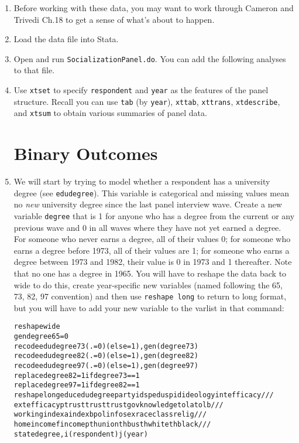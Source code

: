 \documentclass[a4paper,12pt]{article}
\begin{document}
\begin{enumerate}\itemsep1em

\section{Getting Started}

\item Before working with these data, you may want to work through Cameron and Trivedi Ch.18 to get a sense of what's about to happen.

\item Load the data file into Stata.

\item Open and run \texttt{SocializationPanel.do}. You can add the following analyses to that file.

\item Use \texttt{xtset} to specify \texttt{respondent} and \texttt{year} as the features of the panel structure. Recall you can use \texttt{tab} (by \texttt{year}), \texttt{xttab}, \texttt{xttrans}, \texttt{xtdescribe}, and \texttt{xtsum} to obtain various summaries of panel data.

\section{Binary Outcomes}

\item We will start by trying to model whether a respondent has a university degree (see \texttt{edudegree}). This variable is categorical and missing values mean no \textit{new} university degree since the last panel interview wave. Create a new variable \texttt{degree} that is 1 for anyone who has a degree from the current or any previous wave and 0 in all waves where they have not yet earned a degree. For someone who never earns a degree, all of their values 0; for someone who earns a degree before 1973, all of their values are 1; for someone who earns a degree between 1973 and 1982, their value is 0 in 1973 and 1 thereafter. Note that no one has a degree in 1965. You will have to reshape the data back to wide to do this, create year-specific new variables (named following the 65, 73, 82, 97 convention) and then use \texttt{reshape long} to return to long format, but you will have to add your new variable to the varlist in that command:

\begin{alltt}
reshape wide
gen degree65 = 0
recode edudegree73 (.=0) (else=1), gen(degree73)
recode edudegree82 (.=0) (else=1), gen(degree82)
recode edudegree97 (.=0) (else=1), gen(degree97)
replace degree82 = 1 if degree73 == 1
replace degree97 = 1 if degree82 == 1
reshape long educ edudegree partyid spedu spid ideology intefficacy ///
             extefficacy ptrust trust trustgov knowledge tola tolb ///
             working indexa indexb polinfo sex race class relig ///
             home incomef incomep thunion thbus thwhite thblack ///
             state degree, i(respondent) j(year)
\end{alltt}


\end{enumerate}
\end{document}
